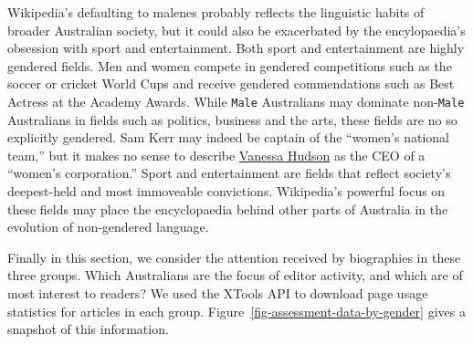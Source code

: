 \documentclass[
  a4paper,
  DIV=11,
  numbers=noendperiod]{scrreprt}
\begin{document}
Wikipedia's defaulting to malenes probably reflects the linguistic
habits of broader Australian society, but it could also be exacerbated
by the encylopaedia's obsession with sport and entertainment. Both sport
and entertainment are highly gendered fields. Men and women compete in
gendered competitions such as the soccer or cricket World Cups and
receive gendered commendations such as Best Actress at the Academy
Awards. While \texttt{Male} Australians may dominate non-\texttt{Male}
Australians in fields such as politics, business and the arts, these
fields are no so explicitly gendered. Sam Kerr may indeed be captain of
the ``women's national team,'' but it makes no sense to describe
\href{https://en.wikipedia.org/wiki/Vanessa_Hudson_(executive)}{Vanessa
Hudson} as the CEO of a ``women's corporation.'' Sport and entertainment
are fields that reflect society's deepest-held and most immoveable
convictions. Wikipedia's powerful focus on these fields may place the
encyclopaedia behind other parts of Australia in the evolution of
non-gendered language.

Finally in this section, we consider the attention received by
biographies in these three groups. Which Australians are the focus of
editor activity, and which are of most interest to readers? We used the
XTools API to download page usage statistics for articles in each group.
Figure~\ref{fig-assessment-data-by-gender} gives a snapshot of this
information.
\end{document}
